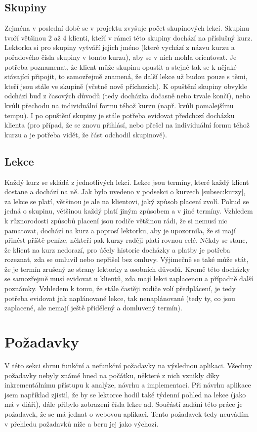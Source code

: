         \subsection{Skupiny}\label{subsec:skupiny}
        Zejména v poslední době se v projektu zvyšuje počet skupinových lekcí. Skupinu tvoří většinou 2 až 4 klienti, kteří v rámci této skupiny dochází na příslušný kurz. Lektorka si pro skupiny vytváří jejich jméno (které vychází z názvu kurzu a pořadového čísla skupiny v tomto kurzu), aby se v nich mohla orientovat. Je potřeba poznamenat, že klient může skupinu opustit a stejně tak se k nějaké stávající připojit, to samozřejmě znamená, že další lekce už budou pouze s těmi, kteří jsou stále ve skupině (včetně nově příchozích). K opuštění skupiny obvykle odchází buď z časových důvodů (tedy docházka dočasně nebo trvale končí), nebo kvůli přechodu na individuální formu téhož kurzu (např. kvůli pomalejšímu tempu). I po opuštění skupiny je stále potřeba evidovat předchozí docházku klienta (pro případ, že se znovu přihlásí, nebo přešel na individuální formu téhož kurzu a je potřeba vidět, že část odchodil skupinově). 
        
        \subsection{Lekce}
        Každý kurz se skládá z jednotlivých lekcí. Lekce jsou termíny, které každý klient dostane a dochází na ně. Jak bylo uvedeno v podsekci o kurzech \ref{subsec:kurzy}, za lekce se platí, většinou je ale na klientovi, jaký způsob placení zvolí. Pokud se jedná o skupinu, většinou každý platí jiným způsobem a v jiné termíny. Vzhledem k různorodosti způsobů placení jsou rodiče většinou rádi, že si nemusí nic pamatovat, dochází na kurz a poprosí lektorku, aby je upozornila, že si mají přinést příště peníze, někteří pak kurzy raději platí rovnou celé. Někdy se stane, že klient na kurz nedorazí, pro účely historie docházky a platby je potřeba rozeznat, zda se omluvil nebo nepřišel bez omluvy. Výjimečně se také může stát, že je termín zrušený ze strany lektorky z osobních důvodů. Kromě této docházky se samozřejmě musí evidovat u klientů, zda mají lekci zaplacenou a případně další poznámky. Vzhledem k tomu, že stále častěji rodiče volí předplácení, je tedy potřeba evidovat jak naplánované lekce, tak nenaplánované (tedy ty, co jsou zaplacené, ale nemají ještě přidělený a domluvený termín).
    
    \section{Požadavky}
    V této sekci shrnu funkční a nefunkční požadavky na výslednou aplikaci. Všechny požadavky nebyly známé hned na počátku, některé z nich vznikly díky inkrementálnímu přístupu k analýze, návrhu a implementaci. Při návrhu aplikace jsem například zjistil, že by se lektorce hodil také týdenní pohled na lekce (jako má v diáři), dále přibylo zobrazení čísla lekce ad. Součástí zadání této práce je požadavek, že se má jednat o webovou aplikaci. Tento požadavek tedy neuvádím v přehledu požadavků níže a beru jej jako výchozí.
    
